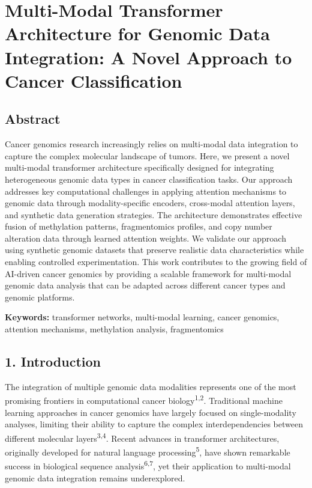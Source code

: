 \section{Multi-Modal Transformer Architecture for Genomic Data
Integration: A Novel Approach to Cancer
Classification}\label{multi-modal-transformer-architecture-for-genomic-data-integration-a-novel-approach-to-cancer-classification}

\subsection{Abstract}\label{abstract}

Cancer genomics research increasingly relies on multi-modal data
integration to capture the complex molecular landscape of tumors. Here,
we present a novel multi-modal transformer architecture specifically
designed for integrating heterogeneous genomic data types in cancer
classification tasks. Our approach addresses key computational
challenges in applying attention mechanisms to genomic data through
modality-specific encoders, cross-modal attention layers, and synthetic
data generation strategies. The architecture demonstrates effective
fusion of methylation patterns, fragmentomics profiles, and copy number
alteration data through learned attention weights. We validate our
approach using synthetic genomic datasets that preserve realistic data
characteristics while enabling controlled experimentation. This work
contributes to the growing field of AI-driven cancer genomics by
providing a scalable framework for multi-modal genomic data analysis
that can be adapted across different cancer types and genomic platforms.

\textbf{Keywords:} transformer networks, multi-modal learning, cancer
genomics, attention mechanisms, methylation analysis, fragmentomics

\subsection{1. Introduction}\label{introduction}

The integration of multiple genomic data modalities represents one of
the most promising frontiers in computational cancer
biology\textsuperscript{1,2}. Traditional machine learning approaches in
cancer genomics have largely focused on single-modality analyses,
limiting their ability to capture the complex interdependencies between
different molecular layers\textsuperscript{3,4}. Recent advances in
transformer architectures, originally developed for natural language
processing\textsuperscript{5}, have shown remarkable success in
biological sequence analysis\textsuperscript{6,7}, yet their application
to multi-modal genomic data integration remains underexplored.

